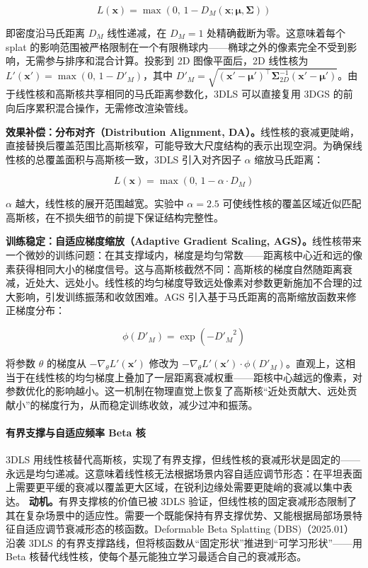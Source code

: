 \begin{equation}
L(\mathbf{x}) = \max(0,\, 1 - D_M(\mathbf{x}; \boldsymbol{\mu}, \boldsymbol{\Sigma}))
\end{equation}

即密度沿马氏距离 $D_M$ 线性递减，在 $D_M = 1$ 处精确截断为零。这意味着每个 splat 的影响范围被严格限制在一个有限椭球内——椭球之外的像素完全不受到影响，无需参与排序和混合计算。投影到 2D 图像平面后，2D 线性核为 $L'(\mathbf{x}') = \max(0,\, 1 - D'_M)$，其中 $D'_M = \sqrt{(\mathbf{x}'-\boldsymbol{\mu}')^\top \boldsymbol{\Sigma}_{2D}^{-1}(\mathbf{x}'-\boldsymbol{\mu}')}$。由于线性核和高斯核共享相同的马氏距离参数化，3DLS 可以直接复用 3DGS 的前向后序累积混合操作，无需修改渲染管线。

\textbf{效果补偿：分布对齐（Distribution Alignment, DA）。}线性核的衰减更陡峭，直接替换后覆盖范围比高斯核窄，可能导致大尺度结构的表示出现空洞。为确保线性核的总覆盖面积与高斯核一致，3DLS 引入对齐因子 $\alpha$ 缩放马氏距离：

\begin{equation}
L(\mathbf{x}) = \max(0,\, 1 - \alpha \cdot D_M)
\end{equation}

$\alpha$ 越大，线性核的展开范围越宽。实验中 $\alpha = 2.5$ 可使线性核的覆盖区域近似匹配高斯核，在不损失细节的前提下保证结构完整性。

\textbf{训练稳定：自适应梯度缩放（Adaptive Gradient Scaling, AGS）。}线性核带来一个微妙的训练问题：在其支撑域内，梯度是均匀常数——距离核中心近和远的像素获得相同大小的梯度信号。这与高斯核截然不同：高斯核的梯度自然随距离衰减，近处大、远处小。线性核的均匀梯度导致远处像素对参数更新施加不合理的过大影响，引发训练振荡和收敛困难。AGS 引入基于马氏距离的高斯缩放函数来修正梯度分布：

\begin{equation}
\phi(D'_M) = \exp(-{D'_M}^2)
\end{equation}

将参数 $\theta$ 的梯度从 $-\nabla_\theta L'(\mathbf{x}')$ 修改为 $-\nabla_\theta L'(\mathbf{x}') \cdot \phi(D'_M)$。直观上，这相当于在线性核的均匀梯度上叠加了一层距离衰减权重——距核中心越远的像素，对参数优化的影响越小。这一机制在物理直觉上恢复了高斯核``近处贡献大、远处贡献小''的梯度行为，从而稳定训练收敛，减少过冲和振荡。

\paragraph{有界支撑与自适应频率 Beta 核}

3DLS 用线性核替代高斯核，实现了有界支撑，但线性核的衰减形状是固定的——永远是均匀递减。这意味着线性核无法根据场景内容自适应调节形态：在平坦表面上需要更平缓的衰减以覆盖更大区域，在锐利边缘处需要更陡峭的衰减以集中表达。
\textbf{动机。}有界支撑核的价值已被 3DLS 验证，但线性核的固定衰减形态限制了其在复杂场景中的适应性。需要一个既能保持有界支撑优势、又能根据局部场景特征自适应调节衰减形态的核函数。Deformable Beta Splatting (DBS)（2025.01）~\cite{2501_18630} 沿袭 3DLS 的有界支撑路线，但将核函数从``固定形状''推进到``可学习形状''——用 Beta 核替代线性核，使每个基元能独立学习最适合自己的衰减形态。


